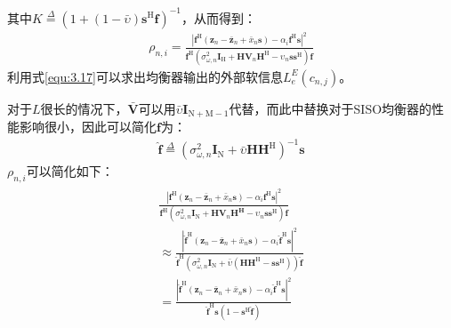 其中$K\overset{\Delta}{=}(1+(1-\bar{\upsilon})\mathbf{s}^{\mathrm{H}}\mathbf{f})^{-1}$，从而得到：
\begin{eqnarray}
    \rho_{n,i}=\frac{|\mathbf{f}^{\mathrm{H}}(\mathbf{z}_n-\bar{\mathbf{z}}_n+\bar{x}_n\mathbf{s})-\alpha_i\mathbf{f}^{\mathrm{H}}\mathbf{s}|^2}{\mathbf{f}^{\mathrm{H}}(\sigma_{\omega,n}^2\mathbf{I}_{\mathrm{H}}+\mathbf{H}\mathbf{V}_n\mathbf{H}^{\mathrm{H}}-\upsilon_n\mathbf{s}\mathbf{s}^{\mathrm{H}})\mathbf{f}}
    \label{equ:3.35}
\end{eqnarray}
利用式\ref{equ:3.17}可以求出均衡器输出的外部软信息$L_e^E(c_{n,j})$。

对于$L$很长的情况下，$\bar{\mathbf{V}}$可以用$\bar{\upsilon}\mathbf{I}_{\mathrm{N+M}-1}$代替，而此中替换对于SISO均衡器的性能影响很小，因此可以简化$\mathbf{f}$为：
\begin{eqnarray}
    \hat{\mathbf{f}}\overset{\Delta}{=}(\sigma_{\omega,n}^2\mathbf{I}_{\mathrm{N}}+\bar{\upsilon}\mathbf{H}\mathbf{H}^{\mathrm{H}})^{-1}\mathbf{s}
    \label{equ:3.36}
\end{eqnarray}
$\rho_{n,i}$可以简化如下：
\begin{eqnarray}
    \begin{array}{c}
        \frac{\displaystyle
        |\mathbf{f}^{\mathrm{H}}(\mathbf{z}_n-\bar{\mathbf{z}}_n+\bar{x}_n\mathbf{s})-\alpha_i\mathbf{f}^{\mathrm{H}}\mathbf{s}|^2}{\displaystyle
        \mathbf{f}^{\mathrm{H}}(\sigma_{\omega,n}^2\mathbf{I}_{\mathrm{N}}+\mathbf{H}\mathbf{V}_n\mathbf{H}^{\mathbf{H}}-\upsilon_n\mathbf{s}\mathbf{s}^{\mathrm{H}})\mathbf{f}}\\
        \approx
        \frac{\displaystyle
        |\hat{\mathbf{f}}^{\mathrm{H}}(\mathbf{z}_n-\bar{\mathbf{z}}_n+\bar{x}_n\mathbf{s})-\alpha_i\hat{\mathbf{f}}^{\mathrm{H}}\mathbf{s}|^2}{\displaystyle
        \hat{\mathbf{f}}^{\mathrm{H}}(\sigma_{\omega,n}^2\mathbf{I}_{\mathrm{N}}+\bar{\upsilon}(\mathbf{H}\mathbf{H}^{\mathrm{H}}-\mathbf{s}\mathbf{s}^{\mathrm{H}}))\hat{\mathbf{f}}}\\
        =\frac{\displaystyle
        |\hat{\mathbf{f}}^{\mathrm{H}}(\mathbf{z}_n-\bar{\mathbf{z}}_n+\bar{x}_n\mathbf{s})-\alpha_i\hat{\mathbf{f}}^{\mathrm{H}}\mathbf{s}|^2}{\displaystyle \hat{\mathbf{f}}^{\mathrm{H}}\mathbf{s}(1-\mathbf{s}^{\mathrm{H}}\hat{\mathbf{f}})}
    \end{array}
    \label{equ:3.37}
\end{eqnarray}

